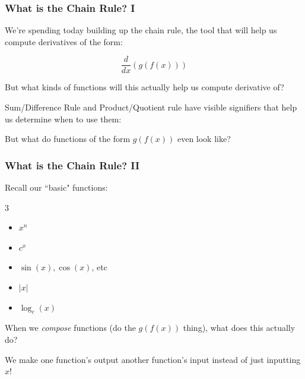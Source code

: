 \documentclass{ltx-talk}
\begin{document}
\begin{frame}
  \frametitle{What is the Chain Rule? I}

  We're spending today building up the chain rule, the tool that will help us compute derivatives of the form: \pause

  \begin{equation}
    \dfrac{d}{dx} ( g (f(x)))
  \end{equation}

  But what kinds of functions will this actually help us compute derivative of? \pause

  Sum/Difference Rule and Product/Quotient rule have visible signifiers that help us determine when to use them: \pause
  \vspace{1in}

  But what do functions of the form $g(f(x))$ even look like?
\end{frame}

\begin{frame}
  \frametitle{What is the Chain Rule? II}

  Recall our ``basic" functions: \pause

  \begin{multicols}{3}
    \begin{itemize}
      \item $x^n$
      \item $c^x$
      \item $\sin(x), \cos(x)$, etc
      \item $|x|$
      \item $\log_c(x)$
    \end{itemize} \pause

  \end{multicols}

  When we \textit{compose} functions (do the $g(f(x))$ thing), what does this actually do? \pause

  We make one function's output another function's input instead of just inputting $x$! 
\end{frame}
\end{document}
